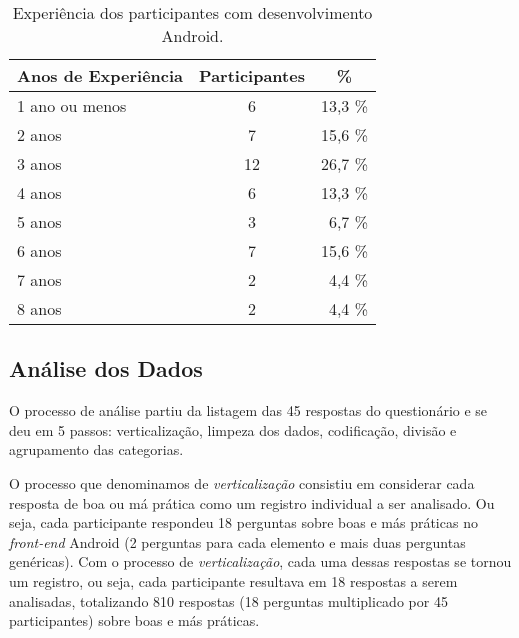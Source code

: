 \begin{table}[h]
\centering
\caption{Experi\^encia dos participantes com desenvolvimento Android.}
\small
\begin{tabular}{@{}l|c|r@{}}
\toprule
\textbf{Anos de Experi\^encia} & \textbf{Participantes} & \multicolumn{1}{c}{\textbf{\%}}  \\
\hline
1 ano ou menos 	&	 6 		& 	13,3 \%	 \\
2 anos 			& 	 7 		& 	15,6 \%	 \\
3 anos 			& 	 12		& 	26,7 \%	 \\
4 anos 			& 	 6 		& 	13,3 \%	 \\
5 anos 			& 	 3 		& 	 6,7 \%	 \\
6 anos 			& 	 7 		& 	15,6 \%	 \\
7 anos 			& 	 2 		& 	 4,4 \%	 \\
8 anos 			& 	 2 		& 	 4,4 \%	 \\
\toprule
\end{tabular}
\label{tab:DadosDemograficos}
\end{table}


\subsection{An\'alise dos Dados}
\label{sub:smells-definition}

O processo de an\'alise partiu da listagem das 45 respostas do question\'ario e se deu em 5 passos: verticaliza\c{c}\~ao, limpeza dos dados, codifica\c{c}\~ao, divis\~ao e agrupamento das categorias. 

O processo que denominamos de \textit{verticaliza\c{c}\~ao} consistiu em considerar cada resposta de boa ou m\'a pr\'atica como um registro individual a ser analisado. Ou seja, cada participante respondeu 18 perguntas sobre boas e m\'as pr\'aticas no \textit{front-end} Android (2 perguntas para cada elemento e mais duas perguntas gen\'ericas). Com o processo de \textit{verticaliza\c{c}\~ao}, cada uma dessas respostas se tornou um registro, ou seja, cada participante resultava em 18 respostas a serem analisadas, totalizando 810 respostas (18 perguntas multiplicado por 45 participantes) sobre boas e m\'as pr\'aticas.

